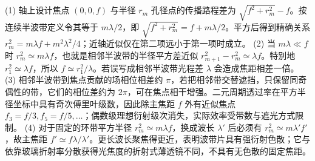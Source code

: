 (1) 轴上设计焦点 \((0,0,f)\) 与半径 \(r_m\) 孔径点的传播路程差为 \(\sqrt{f^2+r_m^2}-f\)。按连续半波带定义令其等于 \(m\lambda/2\)，即 \(\sqrt{f^2+r_m^2}=f+m\lambda/2\)。平方后得到精确关系 \(r_m^2=m\lambda f+m^2\lambda^2/4\)；近轴近似仅在第二项远小于第一项时成立。
(2) 当 \(m\lambda\ll f\) 时 \(r_m^2\simeq m\lambda f\)，也就是相邻半波带的半径平方差近似 \(r_{m+1}^2-r_m^2\simeq\lambda f\)。特别地 \(r_1^2\simeq\lambda f\)，所以 \(f\simeq r_1^2/\lambda\)。若误写成相邻半波带光程差 \(\lambda\) 会造成焦距相差一倍。
(3) 相邻半波带到焦点贡献的场相位相差约 \(\pi\)，若把相邻带交替遮挡，只保留同奇偶性的带，它们的相位差约为 \(2\pi\)，可在焦点相干增强。二元周期透过率在平方半径坐标中具有奇次傅里叶级数，因此除主焦距 \(f\) 外有近似焦点 \(f_3=f/3,f_5=f/5,\ldots\)；偶数级理想衍射级次消失，实际效率受带数与遮光方式限制。
(4) 对于固定的环带平方半径 \(r_m^2\simeq m\lambda f\)，换成波长 \(\lambda'\) 后必须有 \(r_m^2\simeq m\lambda'f'\)，故主焦距 \(f'\simeq f\lambda/\lambda'\)。更长波长聚焦得更近，表明波带片具有强衍射色散；它与依靠玻璃折射率分散获得光焦度的折射式薄透镜不同，不具有无色散的固定焦距。
